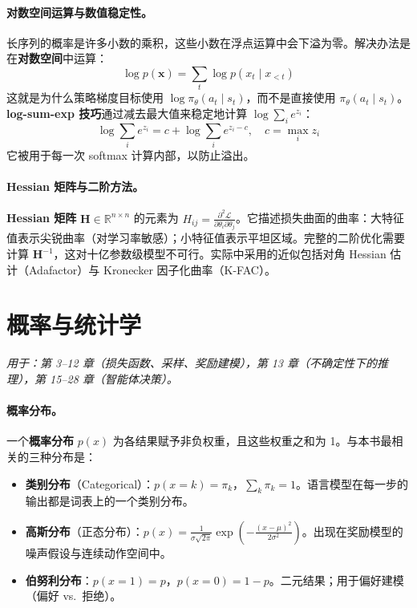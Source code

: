 \paragraph{对数空间运算与数值稳定性。}
长序列的概率是许多小数的乘积，这些小数在浮点运算中会下溢为零。解决办法是在\textbf{对数空间}中运算：
\[
\log p(\mathbf{x}) = \sum_t \log p(x_t \mid x_{<t})
\]
这就是为什么策略梯度目标使用 $\log \pi_\theta(a_t \mid s_t)$，而不是直接使用 $\pi_\theta(a_t \mid s_t)$。\textbf{log-sum-exp 技巧}通过减去最大值来稳定地计算 $\log\sum_i e^{z_i}$：
\[
\log \sum_i e^{z_i} = c + \log \sum_i e^{z_i - c}, \quad c = \max_i z_i
\]
它被用于每一次 softmax 计算内部，以防止溢出。

\paragraph{Hessian 矩阵与二阶方法。}
\textbf{Hessian 矩阵} $\mathbf{H} \in \mathbb{R}^{n \times n}$ 的元素为 $H_{ij} = \frac{\partial^2 \mathcal{L}}{\partial \theta_i \partial \theta_j}$。它描述损失曲面的曲率：大特征值表示尖锐曲率（对学习率敏感）；小特征值表示平坦区域。完整的二阶优化需要计算 $\mathbf{H}^{-1}$，这对十亿参数级模型不可行。实际中采用的近似包括对角 Hessian 估计（Adafactor）与 Kronecker 因子化曲率（K-FAC）。

\section{概率与统计学}
\label{app:probability}

\emph{用于：第 3--12 章（损失函数、采样、奖励建模），第 13 章（不确定性下的推理），第 15--28 章（智能体决策）。}

\paragraph{概率分布。}
一个\textbf{概率分布} $p(x)$ 为各结果赋予非负权重，且这些权重之和为 1。与本书最相关的三种分布是：
\begin{itemize}
  \item \textbf{类别分布}（Categorical）：$p(x = k) = \pi_k$，$\sum_k \pi_k = 1$。语言模型在每一步的输出都是词表上的一个类别分布。
  \item \textbf{高斯分布}（正态分布）：$p(x) = \frac{1}{\sigma\sqrt{2\pi}}\exp\!\left(-\frac{(x-\mu)^2}{2\sigma^2}\right)$。出现在奖励模型的噪声假设与连续动作空间中。
  \item \textbf{伯努利分布}：$p(x=1) = p$，$p(x=0) = 1-p$。二元结果；用于偏好建模（偏好 vs.\ 拒绝）。
\end{itemize}

